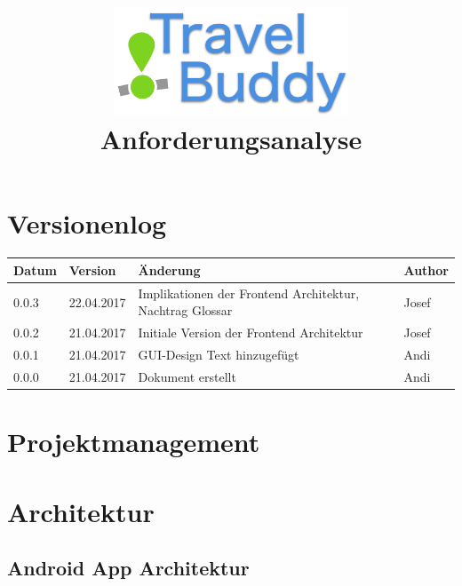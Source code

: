 \documentclass[a4paper,10pt,xetex]{article}
\title{
  \includegraphics[width=7cm]{travel-buddy_white}\\[\bigskipamount]
  Anforderungsanalyse\\[\bigskipamount]
}
\author{\documentauthors}
\date{\parbox{\linewidth}{\centering%
  IT15TA ZH \hspace*{3cm} Gruppe 3\endgraf\bigskip
  \documentdate\endgraf
}}
\begin{document}
\maketitle\newpage

{
\hypersetup{linkcolor=black}
\setcounter{tocdepth}{3}
\tableofcontents
}

\newpage

\section{Versionenlog}\label{versionenlog}

\tabulinesep=1.2mm

\begin{longtabu} to \textwidth { | l | l | X[l] | l | }
  \hline
  \textbf{Datum} & \textbf{Version} & \textbf{Änderung} & \textbf{Author} \\
  \hline
  \endhead

   0.0.3 & 22.04.2017 & Implikationen der Frontend Architektur, Nachtrag Glossar & Josef \\
  \hline

   0.0.2 & 21.04.2017 & Initiale Version der Frontend Architektur & Josef \\
   \hline

  0.0.1 & 21.04.2017 & GUI-Design Text hinzugefügt & Andi\\
  \hline

  0.0.0 & 21.04.2017 & Dokument erstellt & Andi\\
  \hline
\end{longtabu}
\newpage

\section{Projektmanagement}\label{projektmanagement}
\section{Architektur}\label{architektur}
\subsection{Android App Architektur}\label{androidapparchitektur}
\end{document}
